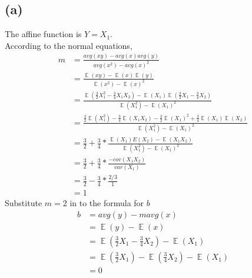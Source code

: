 \documentclass[11pt]{article}
\DeclareMathOperator{\E}{\mathbb{E}}
\begin{document}
\subsection*{(a)}
The affine function is $Y=X_1$.\\
According to the normal equations,
\begin{equation}
    \begin{split}
        m &= \frac{avg(xy)-avg(x) avg(y)}{avg(x^2)-avg(x)^2} \\
        &= \frac{\E(xy)-\E(x)\E(y)}{\E(x^2)-\E(x)^2}\\
        &= \frac{\E(\frac{3}{2}X_1^2-\frac{3}{4}X_1X_2)-\E(X_1)\E(\frac{3}{2}X_1-\frac{3}{4}X_2)}{\E(X_1^2)-\E(X_1)^2} \\
        &= \frac{\frac{3}{2}\E(X_1^2)-\frac{3}{4}\E(X_1X_2)-\frac{3}{2}\E (X_1)^2+\frac{3}{4}\E(X_1)\E(X_2)}{\E(X_1^2)-\E(X_1)^2} \\
        &= \frac{3}{2} + \frac{3}{4} * \frac{\E(X_1)E(X_2)-\E(X_1X_2)}{\E(X_1^2)-\E(X_1)^2} \\
        &= \frac{3}{2} + \frac{3}{4} * \frac{-cov(X_1X_2)}{var(X_1)} \\
        &= \frac{3}{2} - \frac{3}{4} * \frac{2/3}{1} \\
        &= 1
    \end{split}
\end{equation}
Substitute $m=2$ in to the formula for $b$
\begin{equation}
    \begin{split}
        b &= avg(y)-m avg(x) \\
        &= \E(y) - \E(x) \\
        &= \E(\frac{3}{2}X_1-\frac{3}{4}X_2) -\E(X_1) \\
        &= \E (\frac{3}{2}X_1) - \E (\frac{3}{4}X_2) - \E(X_1) \\
        &= 0
    \end{split}
\end{equation}
\end{document}
